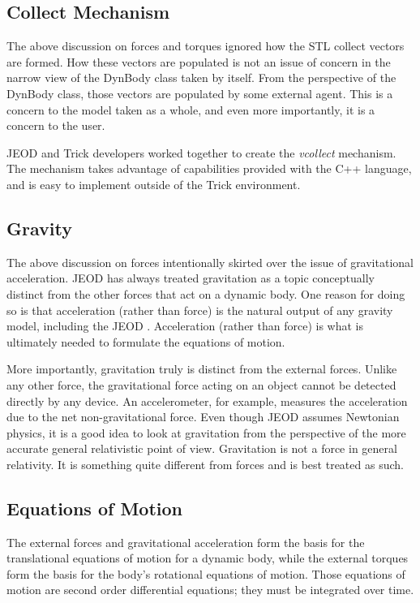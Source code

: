 \subsection*{Collect Mechanism}
The above discussion on forces and torques ignored how the STL collect vectors
are formed. How these vectors are populated is not an issue of concern in the
narrow view of the DynBody class taken by itself. From the perspective of the
DynBody class, those vectors are populated by some external agent.
This is a concern to the model taken as a whole, and even more importantly,
it is a concern to the user.

JEOD and Trick developers worked together to create the \emph{vcollect}
mechanism. The mechanism takes advantage of capabilities provided with the C++
language, and is easy to implement outside of the Trick environment.

\subsection*{Gravity}
The above discussion on forces intentionally skirted over the issue of
gravitational acceleration. JEOD has always treated gravitation as a topic
conceptually distinct from the other forces that act on a dynamic body.
One reason for doing so is that acceleration (rather than force) is the
natural output of any gravity model, including the JEOD \GRAVITY.
Acceleration (rather than force) is what is ultimately needed to formulate the
equations of motion.

More importantly, gravitation truly is distinct from the external forces.
Unlike any other force, the gravitational force acting on an object cannot be
detected directly by any device. An accelerometer, for example, measures the
acceleration due to the net non-gravitational force. Even though JEOD assumes
Newtonian physics, it is a good idea to look at gravitation from the
perspective of the more accurate general relativistic point of view.
Gravitation is not a force in general relativity. It is something quite
different from forces and is best treated as such.

\subsection*{Equations of Motion}
The external forces and gravitational acceleration form the basis for the
translational equations of motion for a dynamic body, while the external torques
form the basis for the body's rotational equations of motion. Those equations
of motion are second order differential equations; they must be integrated over
time.

